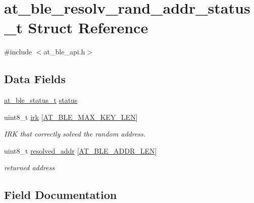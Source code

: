 \hypertarget{structat__ble__resolv__rand__addr__status__t}{}\section{at\+\_\+ble\+\_\+resolv\+\_\+rand\+\_\+addr\+\_\+status\+\_\+t Struct Reference}
\label{structat__ble__resolv__rand__addr__status__t}


{\ttfamily \#include $<$at\+\_\+ble\+\_\+api.\+h$>$}

\subsection*{Data Fields}
\begin{DoxyCompactItemize}
\item 
\mbox{\hyperlink{group__error__codes__group_ga3b1db9b95feb157b3c188ca27fe76988}{at\+\_\+ble\+\_\+status\+\_\+t}} \mbox{\hyperlink{structat__ble__resolv__rand__addr__status__t_a0b48093fc2030779fc47e5216f8019e2}{status}}
\item 
uint8\+\_\+t \mbox{\hyperlink{structat__ble__resolv__rand__addr__status__t_a6976ea27c8e6eefa6ee513454dad7faa}{irk}} \mbox{[}\mbox{\hyperlink{at__ble__api_8h_a462eb50567c44d7284308fe058158e99}{A\+T\+\_\+\+B\+L\+E\+\_\+\+M\+A\+X\+\_\+\+K\+E\+Y\+\_\+\+L\+EN}}\mbox{]}
\begin{DoxyCompactList}\small\item\em I\+RK that correctly solved the random address. \end{DoxyCompactList}\item 
uint8\+\_\+t \mbox{\hyperlink{structat__ble__resolv__rand__addr__status__t_afa616d7021acb4609f2b5ae9ba707b26}{resolved\+\_\+addr}} \mbox{[}\mbox{\hyperlink{at__ble__api_8h_a2452b42d01f07d3cd766fcab56d3ae62}{A\+T\+\_\+\+B\+L\+E\+\_\+\+A\+D\+D\+R\+\_\+\+L\+EN}}\mbox{]}
\begin{DoxyCompactList}\small\item\em returned address \end{DoxyCompactList}\end{DoxyCompactItemize}


\subsection{Field Documentation}
\mbox{\label{structat__ble__resolv__rand__addr__status__t_a6976ea27c8e6eefa6ee513454dad7faa}} 
